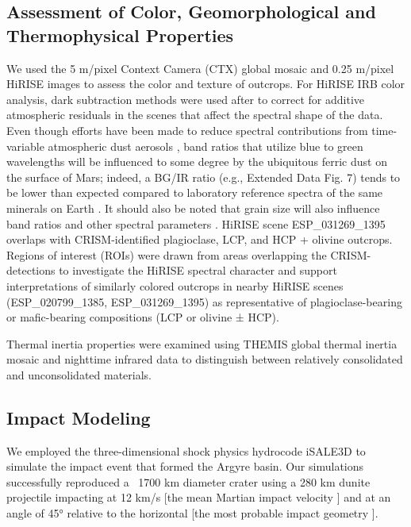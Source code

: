 \documentclass[12pt]{article}
\begin{document}
\subsection*{Assessment of Color, Geomorphological and Thermophysical Properties}

We used the 5 m/pixel Context Camera (CTX) global mosaic \citep{Malin2007, Dickson2018} and 0.25 m/pixel HiRISE images \citep{McEwen2010} to assess the color and texture of outcrops. For HiRISE IRB color analysis, dark subtraction methods were used after \citet{Tornabene2018} to correct for additive atmospheric residuals in the scenes that affect the spectral shape of the data. Even though efforts have been made to reduce spectral contributions from time-variable atmospheric dust aerosols \citep[e.g.,][]{Ceamanos2013, Fernando2013}, band ratios that utilize blue to green wavelengths will be influenced to some degree by the ubiquitous ferric dust on the surface  of Mars; indeed, a BG/IR ratio (e.g., Extended Data Fig. 7) tends to be lower than expected compared to laboratory reference spectra of the same minerals on Earth \citep[e.g.,][]{Delamere2010,Tornabene2018, Rangarajan2024}. It should also be noted that grain size will also influence band ratios and other spectral parameters \citep[e.g.,][]{Hapke1981, Clark1984}. HiRISE scene ESP\_031269\_1395 overlaps with CRISM-identified plagioclase, LCP, and HCP + olivine outcrops. Regions of interest (ROIs) were drawn from areas overlapping the CRISM-detections to investigate the HiRISE spectral character and support interpretations of similarly colored outcrops in nearby HiRISE scenes (ESP\_020799\_1385, ESP\_031269\_1395) as representative of plagioclase-bearing or mafic-bearing compositions (LCP or olivine ± HCP).

Thermal inertia properties were examined using THEMIS global thermal inertia mosaic \citep{Fergason2006, Edwards2009} and nighttime infrared data \citep{Edwards2011} to distinguish between relatively consolidated and unconsolidated materials.
\subsection*{Impact Modeling}
We employed the three-dimensional shock physics hydrocode iSALE3D \citep{Amsden1980, Collins2004, Wunnemann2006} to simulate the impact event that formed the Argyre basin. Our simulations successfully reproduced a ~1700 km diameter crater using a 280 km dunite projectile impacting at 12 km/s [the mean Martian impact velocity \citep{Bottke1994}] and at an angle of 45° relative to the horizontal [the most probable impact geometry \citep{Melosh1989}].
\end{document}
